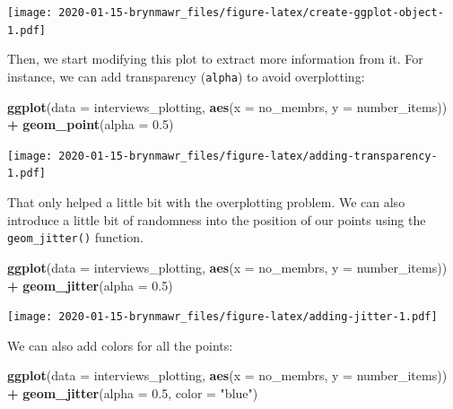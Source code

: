 \documentclass[]{book}
\newenvironment{Shaded}{\begin{snugshade}}{\end{snugshade}}
\newcommand{\KeywordTok}[1]{\textcolor[rgb]{0.13,0.29,0.53}{\textbf{#1}}}
\newcommand{\DataTypeTok}[1]{\textcolor[rgb]{0.13,0.29,0.53}{#1}}
\newcommand{\FloatTok}[1]{\textcolor[rgb]{0.00,0.00,0.81}{#1}}
\newcommand{\StringTok}[1]{\textcolor[rgb]{0.31,0.60,0.02}{#1}}
\newcommand{\OperatorTok}[1]{\textcolor[rgb]{0.81,0.36,0.00}{\textbf{#1}}}
\newcommand{\NormalTok}[1]{#1}
\begin{document}
\texttt{[image: 2020-01-15-brynmawr\_files/figure-latex/create-ggplot-object-1.pdf]}

Then, we start modifying this plot to extract more information from it.
For instance, we can add transparency (\texttt{alpha}) to avoid
overplotting:

\begin{Shaded}
\begin{Highlighting}[]
\KeywordTok{ggplot}\NormalTok{(}\DataTypeTok{data =}\NormalTok{ interviews_plotting, }\KeywordTok{aes}\NormalTok{(}\DataTypeTok{x =}\NormalTok{ no_membrs, }\DataTypeTok{y =}\NormalTok{ number_items)) }\OperatorTok{+}
\StringTok{    }\KeywordTok{geom_point}\NormalTok{(}\DataTypeTok{alpha =} \FloatTok{0.5}\NormalTok{)}
\end{Highlighting}
\end{Shaded}

\texttt{[image: 2020-01-15-brynmawr\_files/figure-latex/adding-transparency-1.pdf]}

That only helped a little bit with the overplotting problem. We can also
introduce a little bit of randomness into the position of our points
using the \texttt{geom\_jitter()} function.

\begin{Shaded}
\begin{Highlighting}[]
\KeywordTok{ggplot}\NormalTok{(}\DataTypeTok{data =}\NormalTok{ interviews_plotting, }\KeywordTok{aes}\NormalTok{(}\DataTypeTok{x =}\NormalTok{ no_membrs, }\DataTypeTok{y =}\NormalTok{ number_items)) }\OperatorTok{+}
\StringTok{    }\KeywordTok{geom_jitter}\NormalTok{(}\DataTypeTok{alpha =} \FloatTok{0.5}\NormalTok{)}
\end{Highlighting}
\end{Shaded}

\texttt{[image: 2020-01-15-brynmawr\_files/figure-latex/adding-jitter-1.pdf]}

We can also add colors for all the points:

\begin{Shaded}
\begin{Highlighting}[]
\KeywordTok{ggplot}\NormalTok{(}\DataTypeTok{data =}\NormalTok{ interviews_plotting, }\KeywordTok{aes}\NormalTok{(}\DataTypeTok{x =}\NormalTok{ no_membrs, }\DataTypeTok{y =}\NormalTok{ number_items)) }\OperatorTok{+}
\StringTok{    }\KeywordTok{geom_jitter}\NormalTok{(}\DataTypeTok{alpha =} \FloatTok{0.5}\NormalTok{, }\DataTypeTok{color =} \StringTok{"blue"}\NormalTok{)}
\end{Highlighting}
\end{Shaded}
\end{document}
